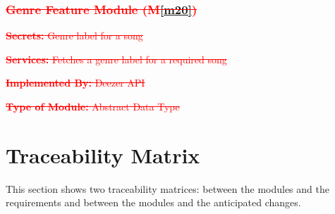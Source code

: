 \documentclass[12pt, titlepage]{article}
\newcommand{\mref}[1]{M\ref{#1}}
\begin{document}


\subsubsection*{\textcolor{red}{\sout{Genre Feature Module (\mref{m20})}}}

\begin{description}
\item \textcolor{red}{\sout{\textbf{Secrets:} Genre label for a song}}
\item \textcolor{red}{\sout{\textbf{Services:} Fetches a genre label for a required song}}
\item \textcolor{red}{\sout{\textbf{Implemented By:} Deezer API}}
\item \textcolor{red}{\sout{\textbf{Type of Module:} Abstract Data Type}}
\end{description}

\section{Traceability Matrix} \label{SecTM}

This section shows two traceability matrices: between the modules and the
requirements and between the modules and the anticipated changes.
\end{document}
